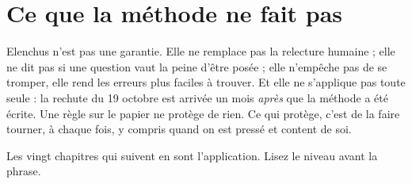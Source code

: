 \section{Ce que la méthode ne fait pas}

Elenchus n'est pas une garantie. Elle ne remplace pas la relecture humaine ; elle ne dit pas si une question vaut la
peine d'être posée ; elle n'empêche pas de se tromper, elle rend les erreurs plus faciles à trouver. Et elle ne
s'applique pas toute seule : la rechute du 19 octobre est arrivée un mois \emph{après} que la méthode a été écrite.
Une règle sur le papier ne protège de rien. Ce qui protège, c'est de la faire tourner, à chaque fois, y compris quand
on est pressé et content de soi.

Les vingt chapitres qui suivent en sont l'application. Lisez le niveau avant la phrase.
